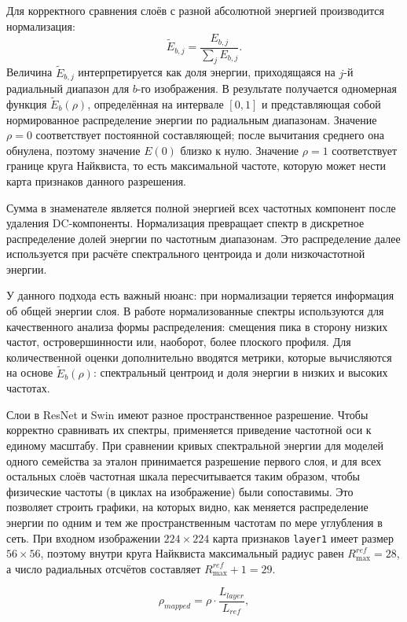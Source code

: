 Для корректного сравнения слоёв с разной абсолютной энергией производится нормализация:
\begin{equation}
\tilde{E}_{b,j} = \frac{E_{b,j}}{\sum_j E_{b,j}}.
\end{equation}
Величина $\tilde{E}_{b,j}$ интерпретируется как доля энергии, приходящаяся на $j$-й радиальный диапазон для $b$-го изображения. В результате получается одномерная функция $\tilde{E}_{b}(\rho)$, определённая на интервале $[0,1]$ и представляющая собой нормированное распределение энергии по радиальным диапазонам. Значение $\rho=0$ соответствует постоянной составляющей; после вычитания среднего она обнулена, поэтому значение $E(0)$ близко к нулю. Значение $\rho=1$ соответствует границе круга Найквиста, то есть максимальной частоте, которую может нести карта признаков данного разрешения.

Сумма в знаменателе является полной энергией всех частотных компонент после удаления DC-компоненты. Нормализация превращает спектр в дискретное распределение долей энергии по частотным диапазонам. Это распределение далее используется при расчёте спектрального центроида и доли низкочастотной энергии.

У данного подхода есть важный нюанс: при нормализации теряется информация об общей энергии слоя. В работе нормализованные спектры используются для качественного анализа формы распределения: смещения пика в сторону низких частот, островершинности или, наоборот, более плоского профиля. Для количественной оценки дополнительно вводятся метрики, которые вычисляются на основе $\tilde E_b(\rho)$: спектральный центроид и доля энергии в низких и высоких частотах.

Слои в ResNet и Swin имеют разное пространственное разрешение. Чтобы корректно сравнивать их спектры, применяется приведение частотной оси к единому масштабу. При сравнении кривых спектральной энергии для моделей одного семейства за эталон принимается разрешение первого слоя, и для всех остальных слоёв частотная шкала пересчитывается таким образом, чтобы физические частоты (в циклах на изображение) были сопоставимы. Это позволяет строить графики, на которых видно, как меняется распределение энергии по одним и тем же пространственным частотам по мере углубления в сеть. При входном изображении $224\times224$ карта признаков \texttt{layer1} имеет размер $56\times56$, поэтому внутри круга Найквиста максимальный радиус равен $R_{\max}^{ref}=28$, а число радиальных отсчётов составляет $R_{\max}^{ref}+1=29$.

\begin{equation}
    \rho_{mapped} = \rho \cdot \frac{L_{layer}}{L_{ref}},
\end{equation}

